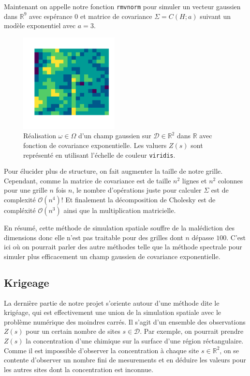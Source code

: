 \documentclass[10pt]{article} %
\begin{document}
Maintenant on appelle notre fonction \texttt{rmvnorm} pour simuler un vecteur gaussien dans $\mathbb{R}^9$ avec espérance $0$ et
matrice de covariance $\Sigma = C(H; a)$ suivant un modèle exponentiel avec $a = 3$.

\begin{figure}[h!]
    \centering
    \includegraphics[width=5cm]{media/grid9.png}
    \caption{Réalisation $\omega \in \Omega$ d'un champ gaussien sur $\mathcal{D} \in \mathbb{R}^2$ dans $\mathbb{R}$ avec fonction de covariance exponentielle. Les valuers $Z(s)$ sont représenté en utilisant l'échelle
    de couleur \texttt{viridis}.}
\end{figure}

Pour élucider plus de structure, on fait augmenter la taille de notre grille. Cependant, comme la matrice de covariance est de taille $n^2$ lignes et $n^2$ colonnes pour une grille $n$ fois $n$, le nombre d'opérations juste pour
calculer $\Sigma$ est de complexité $\mathcal{O}(n^4)$! Et finalement la décomposition de Cholesky est de compléxité $\mathcal{O}(n^3)$ ainsi que la multiplication matricielle.

En résumé, cette méthode de simulation spatiale souffre de la malédiction des dimensions donc elle n'est pas traitable pour des grilles dont $n$
dépasse $100$. C'est ici où on pourrait parler des autre méthodes telle que la méthode spectrale pour simuler plus efficacement un champ gaussien de covariance
exponentielle.

\subsection{Krigeage} La dernière partie de notre projet s'oriente autour d'une méthode dite le krigéage, qui est effectivement une union de la simulation spatiale
avec le problème numérique des moindres carrés. Il s'agit d'un ensemble des observations $Z(s)$ pour un certain nombre de sites $s \in \mathcal{D}$. Par exemple, on pourrait
prendre $Z(s)$ la concentration d'une chimique sur la surface d'une région réctangulaire. Comme il est impossible d'observer la concentration à chaque site $s \in \mathbb{R}^2$,
on se contente d'observer un nombre fini de mesurements et en déduire les valeurs pour les autres sites dont la concentration est inconnue.
\end{document}
